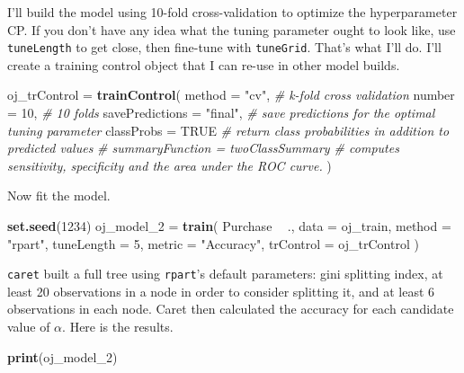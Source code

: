\documentclass[
]{book}
\newenvironment{Shaded}{\begin{snugshade}}{\end{snugshade}}
\newcommand{\CommentTok}[1]{\textcolor[rgb]{0.56,0.35,0.01}{\textit{#1}}}
\newcommand{\DataTypeTok}[1]{\textcolor[rgb]{0.13,0.29,0.53}{#1}}
\newcommand{\DecValTok}[1]{\textcolor[rgb]{0.00,0.00,0.81}{#1}}
\newcommand{\KeywordTok}[1]{\textcolor[rgb]{0.13,0.29,0.53}{\textbf{#1}}}
\newcommand{\NormalTok}[1]{#1}
\newcommand{\OperatorTok}[1]{\textcolor[rgb]{0.81,0.36,0.00}{\textbf{#1}}}
\newcommand{\OtherTok}[1]{\textcolor[rgb]{0.56,0.35,0.01}{#1}}
\newcommand{\StringTok}[1]{\textcolor[rgb]{0.31,0.60,0.02}{#1}}
\begin{document}
I'll build the model using 10-fold cross-validation to optimize the hyperparameter CP. If you don't have any idea what the tuning parameter ought to look like, use \texttt{tuneLength} to get close, then fine-tune with \texttt{tuneGrid}. That's what I'll do. I'll create a training control object that I can re-use in other model builds.

\begin{Shaded}
\begin{Highlighting}[]
\NormalTok{oj_trControl =}\StringTok{ }\KeywordTok{trainControl}\NormalTok{(}
   \DataTypeTok{method =} \StringTok{"cv"}\NormalTok{,  }\CommentTok{# k-fold cross validation}
   \DataTypeTok{number =} \DecValTok{10}\NormalTok{,  }\CommentTok{# 10 folds}
   \DataTypeTok{savePredictions =} \StringTok{"final"}\NormalTok{,       }\CommentTok{# save predictions for the optimal tuning parameter}
   \DataTypeTok{classProbs =} \OtherTok{TRUE}  \CommentTok{# return class probabilities in addition to predicted values}
\CommentTok{#   summaryFunction = twoClassSummary  # computes sensitivity, specificity and the area under the ROC curve.}
\NormalTok{   )}
\end{Highlighting}
\end{Shaded}

Now fit the model.

\begin{Shaded}
\begin{Highlighting}[]
\KeywordTok{set.seed}\NormalTok{(}\DecValTok{1234}\NormalTok{)}
\NormalTok{oj_model_}\DecValTok{2}\NormalTok{ =}\StringTok{ }\KeywordTok{train}\NormalTok{(}
\NormalTok{   Purchase }\OperatorTok{~}\StringTok{ }\NormalTok{., }
   \DataTypeTok{data =}\NormalTok{ oj_train, }
   \DataTypeTok{method =} \StringTok{"rpart"}\NormalTok{,}
   \DataTypeTok{tuneLength =} \DecValTok{5}\NormalTok{,}
   \DataTypeTok{metric =} \StringTok{"Accuracy"}\NormalTok{,}
   \DataTypeTok{trControl =}\NormalTok{ oj_trControl}
\NormalTok{   )}
\end{Highlighting}
\end{Shaded}

\texttt{caret} built a full tree using \texttt{rpart}'s default parameters: gini splitting index, at least 20 observations in a node in order to consider splitting it, and at least 6 observations in each node. Caret then calculated the accuracy for each candidate value of \(\alpha\). Here is the results.

\begin{Shaded}
\begin{Highlighting}[]
\KeywordTok{print}\NormalTok{(oj_model_}\DecValTok{2}\NormalTok{)}
\end{Highlighting}
\end{Shaded}
\end{document}
